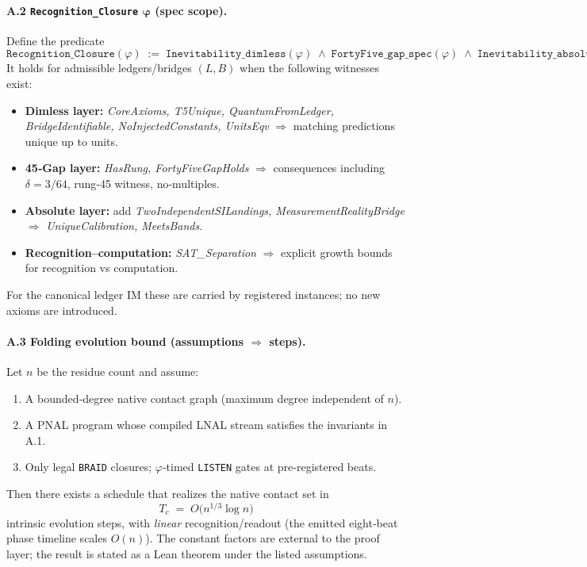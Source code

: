\documentclass[12pt,a4paper]{article}
\begin{document}
\paragraph{A.2 \texttt{Recognition\_Closure} $\boldsymbol{\varphi}$ (spec scope).}
Define the predicate
\[
\texttt{Recognition\_Closure}(\varphi)\;:=\;
\texttt{Inevitability\_dimless}(\varphi)\;\wedge\;
\texttt{FortyFive\_gap\_spec}(\varphi)\;\wedge\;
\texttt{Inevitability\_absolute}(\varphi)\;\wedge\;
\texttt{Inevitability\_recognition\_computation}.
\]
It holds for admissible ledgers/bridges $(L,B)$ when the following witnesses exist:
\begin{itemize}
  \item \textbf{Dimless layer:} \textit{CoreAxioms, T5Unique, QuantumFromLedger, BridgeIdentifiable, NoInjectedConstants, UnitsEqv} $\Rightarrow$ matching predictions unique up to units.
  \item \textbf{45‑Gap layer:} \textit{HasRung, FortyFiveGapHolds} $\Rightarrow$ consequences including $\delta=3/64$, rung‑45 witness, no‑multiples.
  \item \textbf{Absolute layer:} add \textit{TwoIndependentSILandings, MeasurementRealityBridge} $\Rightarrow$ \textit{UniqueCalibration, MeetsBands}.
  \item \textbf{Recognition–computation:} \textit{SAT\_Separation} $\Rightarrow$ explicit growth bounds for recognition vs computation.
\end{itemize}
For the canonical ledger IM these are carried by registered instances; no new axioms are introduced.

\paragraph{A.3 Folding evolution bound (assumptions $\Rightarrow$ steps).}
Let $n$ be the residue count and assume:
\begin{enumerate}
  \item A bounded‑degree native contact graph (maximum degree independent of $n$).
  \item A PNAL program whose compiled LNAL stream satisfies the invariants in A.1.
  \item Only legal \texttt{BRAID} closures; $\varphi$‑timed \texttt{LISTEN} gates at pre‑registered beats.
\end{enumerate}
Then there exists a schedule that realizes the native contact set in
\[
T_c \;=\; O\!\bigl(n^{1/3}\log n\bigr)
\]
intrinsic evolution steps, with \emph{linear} recognition/readout (the emitted eight‑beat phase timeline scales $O(n)$). The constant factors are external to the proof layer; the result is stated as a Lean theorem under the listed assumptions.
\end{document}
